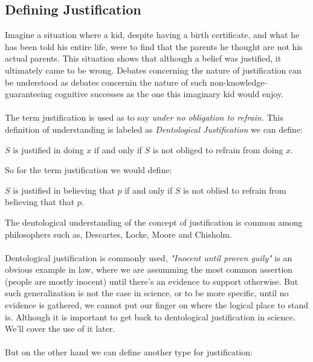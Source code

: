 \documentclass[10pt,a4paper]{article}
\begin{document}
                    \subsection{Defining Justification}
                    Imagine a situation where a kid, despite having a birth certificate, and what he has been told his entire life, were to find that the parents he thought are not his actual parents. This situation shows that although a belief was justified, it ultimately came to be wrong. Debates concerning the nature of justification can be understood as debates concernin the nature of such non-knowledge-guaranteeing cognitive successes as the one this imaginary kid would enjoy.
                    \\
                    \\
                    The term justification is used as to say \textit{under no obligation to refrain.} This definition of understanding is labeled as \textit{Dentological Justification} we can define:
                    \begin{define}
                        $S$ is justified in doing $x$ if and only if $S$ is not obliged to refrain from doing $x$.
                    \end{define}
                    So for the term justification we would define:
                    \begin{define}
                        $S$ is justified in believing that $p$ if and only if $S$ is not oblied to refrain from believing that that $p$.
                    \end{define}
                    The dentological understanding of the concept of justification is common among philosophers such as, Descartes, Locke, Moore and Chisholm.
                    \\
                    \\
                    Dentological justification is commonly used, \textit{"Inocent until proven guily"} is an obvious example in law, where we are assumming the most common assertion (people are mostly inocent) until there's an evidence to support otherwise. But such generalization is not the case in science, or to be more specific, until no evidence is gathered, we cannot put our finger on where the logical place to stand is. Although it is important to get back to dentological justification in science. We'll cover the use of it later.
                    \\
                    \\
                    But on the other hand we can define another type for justification:
\end{document}
